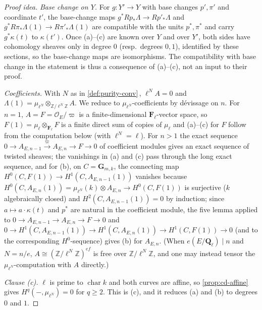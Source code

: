 \documentclass[11pt]{article}
\theoremstyle{plain}
\theoremstyle{definition}
\newcommand{\Z}{\mathbb Z}
\newcommand{\Cref}[1]{\hyperref[#1]{\ref{#1}}\,\hyperref[#1]{\nameref*{#1}}}
\begin{document}
\begin{proof}[Proof idea]
\emph{Base change on $Y$.}  For $g:Y'\to Y$ with base changes $p',\pi'$ and
coordinate $t'$, the base-change maps $g^*Rp_*\Lambda\to Rp'_*\Lambda$ and
$g^*R\pi_*\Lambda(1)\to R\pi'_*\Lambda(1)$ are compatible with the units
$p^*,\pi^*$ and carry $g^*\kappa(t)$ to $\kappa(t')$.  Once (a)--(c) are
known over $Y$ and over $Y'$, both sides have cohomology sheaves only in
degree $0$ (resp.\ degrees $0,1$), identified by these sections, so the
base-change maps are isomorphisms.  The compatibility with base change in
the statement is thus a consequence of (a)--(c), not an input to their proof.

\emph{Coefficients.}  With $N$ as in \Cref{def:purity-conv}, $\ell^NA=0$ and
$\Lambda(1)=\mu_{\ell^N}\otimes_{\Z/\ell^N\Z}A$.  We reduce to
$\mu_{\ell^N}$-coefficients by d\'evissage on $n$.  For $n=1$,
$A=F=\mathcal O_E/\varpi$ is a finite-dimensional $\mathbf F_\ell$-vector
space, so $F(1)=\mu_\ell\otimes_{\mathbf F_\ell}F$ is a finite direct sum of
copies of $\mu_\ell$ and (a)--(c) for $F$ follow from the computation below
(with $\ell^N=\ell$).  For $n>1$ the exact sequence
$0\to A_{E,n-1}\xrightarrow{\varpi}A_{E,n}\to F\to0$ of coefficient modules
gives an exact sequence of twisted sheaves; the vanishings in (a) and (c)
pass through the long exact sequence, and for (b), on $C=\mathbf G_{m,k}$,
the connecting map $H^0(C,F(1))\to H^1(C,A_{E,n-1}(1))$ vanishes because
$H^0(C,A_{E,n}(1))=\mu_{\ell^N}(k)\otimes A_{E,n}\to H^0(C,F(1))$ is
surjective ($k$ algebraically closed) and $H^2(C,A_{E,n-1}(1))=0$ by
induction; since $a\mapsto a\cdot\kappa(t)$ and $p^{*}$ are natural in the
coefficient module, the five lemma applied to
$0\to A_{E,n-1}\to A_{E,n}\to F\to0$ and
$0\to H^1(C,A_{E,n-1}(1))\to H^1(C,A_{E,n}(1))\to H^1(C,F(1))\to0$ (and to
the corresponding $H^0$-sequence) gives (b) for $A_{E,n}$.  (When
$e(E/\mathbf Q_\ell)\mid n$ and $N=n/e$, $A\cong(\Z/\ell^N\Z)^{ef}$ is free
over $\Z/\ell^N\Z$, and one may instead tensor the $\mu_{\ell^N}$-computation
with $A$ directly.)

\emph{Clause (c).}  $\ell$ is prime to $\operatorname{char}k$ and both curves
are affine, so \Cref{prop:cd-affine} gives $H^q(-,\mu_{\ell^N})=0$ for $q\ge2$.
This is (c), and it reduces (a) and (b) to degrees $0$ and $1$.


\end{proof}
\end{document}
